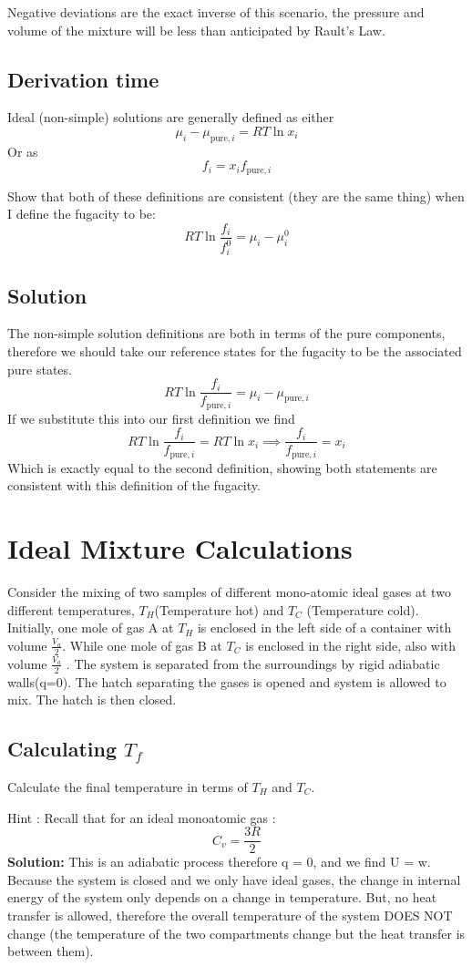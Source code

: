 \documentclass{article}
\newcommand{\be}{\begin{equation}}
\newcommand{\ee}{\end{equation}}
\begin{document}
Negative deviations are the exact inverse of this scenario, the pressure and volume of the mixture will be less than anticipated by Rault's Law. 

\subsection{Derivation time}
Ideal (non-simple) solutions are generally defined as either
\be
\mu_i - \mu_{\text{pure},i} = RT\ln x_i
\ee
Or as
\be
f_i = x_i f_{\text{pure},i}
\ee

Show that both of these definitions are consistent (they are the same thing) when I define the fugacity to be:
\be
RT\ln\frac{f_i}{f_i^0} = \mu_i - \mu_i^0
\ee

\subsection*{Solution}
The non-simple solution definitions are both in terms of the pure components, therefore we should take our reference states for the fugacity to be the associated pure states. 
\be
RT\ln\frac{f_i}{f_{\text{pure},i}} = \mu_i - \mu_{\text{pure},i}
\ee
If we substitute this into our first definition we find
\be
RT\ln\frac{f_i}{f_{\text{pure},i}} =  RT\ln x_i \implies \frac{f_i}{f_{\text{pure},i}} = x_i
\ee
Which is exactly equal to the second definition, showing both statements are consistent with this definition of the fugacity. 

\section{Ideal Mixture Calculations}
Consider the mixing of two samples of different mono-atomic ideal gases at two different
temperatures, $T_H$(Temperature hot) and $T_C$ (Temperature cold). 
Initially, one mole of gas A at $T_H$ is enclosed in the left side of a container with volume $\frac{V_a}{2}$. 
While one mole of gas B at $T_C$ is enclosed in the right side, also with volume $\frac{V_a}{2}$ . 
The system is separated from the surroundings by rigid adiabatic walls(q=0). 
The hatch separating the gases is opened and system is allowed to mix. The hatch is then closed.
\subsection{Calculating $T_f$}
Calculate the final temperature in terms of $T_H$ and $T_C$. 
\bigskip

Hint : Recall that for an ideal monoatomic gas : 
\be
C_v = \frac{3R}{2}
\ee
\textbf{Solution:}
 This is an adiabatic process therefore q = 0, and we find U = w. 
 Because the system is closed and we only have ideal gases, the change in internal energy of the system only depends on a change in temperature. 
 But, no heat transfer is allowed, therefore the overall temperature of the system DOES NOT change (the temperature of the two compartments change but the heat transfer is between them). 
\end{document}
